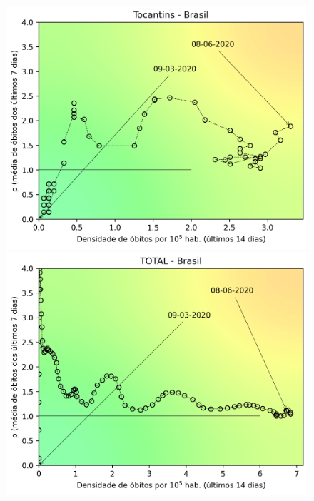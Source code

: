 \documentclass[]{article}
\begin{document}
\begin{figure}[!h]
	\begin{minipage}[t]{4cm}
		\centering
		\includegraphics[scale=0.5]{../TO.png}
	\end{minipage}
	\hspace{5cm}
	\begin{minipage}[t]{4cm}
		\centering
		\includegraphics[scale=0.5]{../TOTAL.png}
		\vspace{0.2cm}
	\end{minipage}
	
\end{figure}
\end{document}
